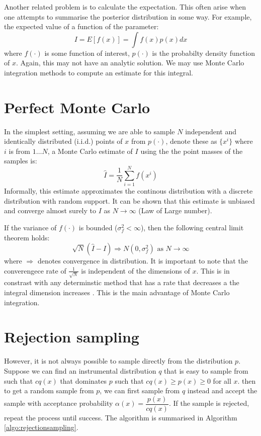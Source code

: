 Another related problem is to calculate the expectation. This often arise when one attempts to summarise the posterior distribution in some way. For example, the expected value of a function of the parameter:
\begin{equation}
  I = E[f(x)] = \int f(x)p(x)dx
\label{eq:int}
\end{equation}
where $f(\cdot)$ is some function of interest, $p(\cdot)$ is the probabilty density function of $x$. Again, this may not have an analytic solution. We may use Monte Carlo integration methods to compute an estimate for this integral.

\section{Perfect Monte Carlo}
In the simplest setting, assuming we are able to sample $N$ independent and identically distributed (i.i.d.) points of $x$ from $p(\cdot)$, denote these as $\{x^i\}$ where $i$ is from $1 \ldots N$, a Monte Carlo estimate of $I$ using the the point masses of the samples is:
\begin{equation}
  \hat{I} = \frac{1}{N} \sum^N_{i=1} f(x^i)
\end{equation}
Informally, this estimate approximates the continous distribution with a discrete distribution with random support. It can be shown that this estimate is unbiased and converge almost surely to $I$ as $N \rightarrow \infty$ (Law of Large number).

If the variance of $f(\cdot)$ is bounded ($\sigma^2_f < \infty$), then the following central limit theorem holds:
\begin{equation}
  \sqrt{N}(\hat{I} - I) \Longrightarrow N(0, \sigma^2_f) \text{ as } N \rightarrow \infty
\end{equation}
where $\Longrightarrow$ denotes convergence in distribution. It is important to note that the converengece rate of $\frac{1}{\sqrt{N}}$ is independent of the dimensions of $x$. This is in constrast with any determinstic method that has a rate that decreases a the integral dimension increases \cite{RCP05}. This is the main advantage of Monte Carlo integration.

\section{Rejection sampling}
However, it is not always possible to sample directly from the distribution $p$. Suppose we can find an instrumental distribution $q$ that is easy to sample from such that $cq(x)$ that dominates $p$ such that $cq(x) \geq p(x) \geq 0$ for all $x$. then to get a random sample from $p$, we can first sample from $q$ instead and accept the sample with acceptance probability $\alpha(x)=\dfrac{p(x)}{cq(x)}$. If the sample is rejected, repeat the process until success. The algorithm is summarised in Algorithm \ref{algo:rejectionsampling}.

